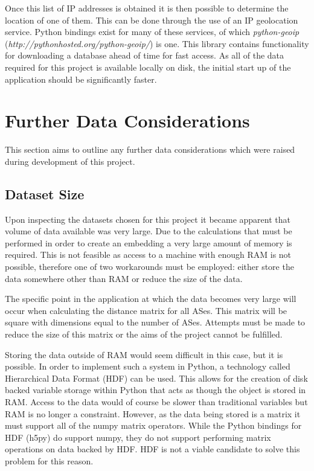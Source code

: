 Once this list of IP addresses is obtained it is then possible to determine the location of one of them. This can be done through the use of an IP geolocation service. Python bindings exist for many of these services, of which \textit{python-geoip} (\textit{http://pythonhosted.org/python-geoip/}) is one. This library contains functionality for downloading a database ahead of time for fast access. As all of the data required for this project is available locally on disk, the initial start up of the application should be significantly faster. 

\section{Further Data Considerations}

This section aims to outline any further data considerations which were raised during development of this project.

\subsection{Dataset Size}

Upon inspecting the datasets chosen for this project it became apparent that volume of data available was very large. Due to the calculations that must be performed in order to create an embedding a very large amount of memory is required. This is not feasible as access to a machine with enough RAM is not possible, therefore one of two workarounds must be employed: either store the data somewhere other than RAM or reduce the size of the data. 

The specific point in the application at which the data becomes very large will occur when calculating the distance matrix for all ASes. This matrix will be square with dimensions equal to the number of ASes. Attempts must be made to reduce the size of this matrix or the aims of the project cannot be fulfilled.

Storing the data outside of RAM would seem difficult in this case, but it is possible. In order to implement such a system in Python, a technology called Hierarchical Data Format (HDF) can be used. This allows for the creation of disk backed variable storage within Python that acts as though the object is stored in RAM. Access to the data would of course be slower than traditional variables but RAM is no longer a constraint. However, as the data being stored is a matrix it must support all of the numpy matrix operators. While the Python bindings for HDF (h5py) do support numpy, they do not support performing matrix operations on data backed by HDF. HDF is not a viable candidate to solve this problem for this reason.

